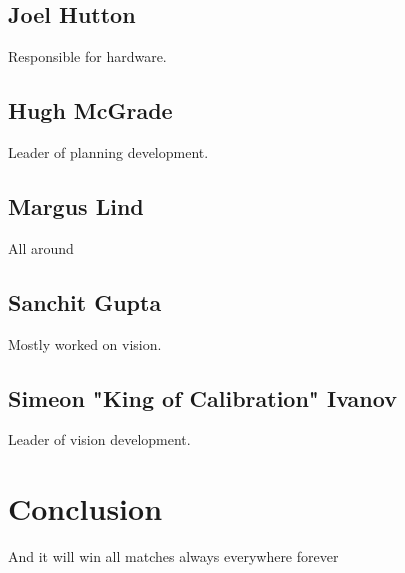 \documentclass[12pt,a4paper,titlepage]{article}
\begin{document}
\subsection{Joel Hutton}
Responsible for hardware.

\subsection{Hugh McGrade}
Leader of planning development.

\subsection{Margus Lind}
All around

\subsection{Sanchit Gupta}
Mostly worked on vision.

\subsection{Simeon "King of Calibration" Ivanov}
Leader of vision development.









\section{Conclusion}
And it will win all matches always everywhere forever
\end{document}
